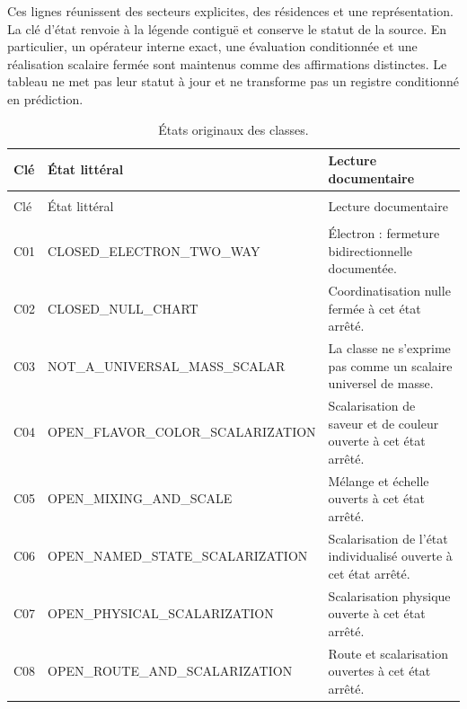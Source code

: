 Ces lignes réunissent des secteurs explicites, des résidences et une représentation. La clé
d’état renvoie à la légende contiguë et conserve le statut de la source.
En particulier, un opérateur interne exact, une évaluation conditionnée et une
réalisation scalaire fermée sont maintenus comme des affirmations distinctes. Le tableau
ne met pas leur statut à jour et ne transforme pas un registre conditionné en prédiction.

\begingroup
\setlength{\tabcolsep}{4pt}
\setlength{\extrarowheight}{4pt}
\renewcommand{\arraystretch}{1.13}
\begin{longtable}{@{}>{\raggedright\arraybackslash}p{}>{\raggedright\arraybackslash}p{}>{\raggedright\arraybackslash}p{}@{}}
\caption{États originaux des classes.}\label{tab:vi-estados-clases}\\
\toprule
Clé & État littéral & Lecture documentaire \\
\midrule
\endfirsthead
\multicolumn{3}{l}{\textit{Suite}}\\
\toprule
Clé & État littéral & Lecture documentaire \\
\midrule
\endhead
\midrule
\multicolumn{3}{r}{Suite à la page suivante}\\
\endfoot
\bottomrule
\endlastfoot
C01 & CLOSED\_\allowbreak{}ELECTRON\_\allowbreak{}TWO\_\allowbreak{}WAY & Électron : fermeture bidirectionnelle documentée. \\
C02 & CLOSED\_\allowbreak{}NULL\_\allowbreak{}CHART & Coordinatisation nulle fermée à cet état arrêté. \\
C03 & NOT\_\allowbreak{}A\_\allowbreak{}UNIVERSAL\_\allowbreak{}MASS\_\allowbreak{}SCALAR & La classe ne s’exprime pas comme un scalaire universel de masse. \\
C04 & OPEN\_\allowbreak{}FLAVOR\_\allowbreak{}COLOR\_\allowbreak{}SCALARIZATION & Scalarisation de saveur et de couleur ouverte à cet état arrêté. \\
C05 & OPEN\_\allowbreak{}MIXING\_\allowbreak{}AND\_\allowbreak{}SCALE & Mélange et échelle ouverts à cet état arrêté. \\
C06 & OPEN\_\allowbreak{}NAMED\_\allowbreak{}STATE\_\allowbreak{}SCALARIZATION & Scalarisation de l’état individualisé ouverte à cet état arrêté. \\
C07 & OPEN\_\allowbreak{}PHYSICAL\_\allowbreak{}SCALARIZATION & Scalarisation physique ouverte à cet état arrêté. \\
C08 & OPEN\_\allowbreak{}ROUTE\_\allowbreak{}AND\_\allowbreak{}SCALARIZATION & Route et scalarisation ouvertes à cet état arrêté. \\
\end{longtable}
\endgroup

